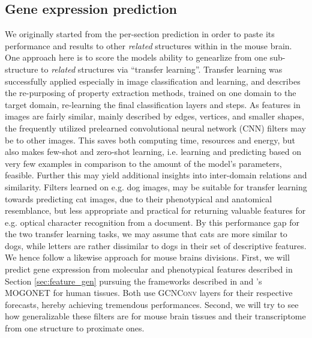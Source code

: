 \documentclass[]{article}
\begin{document}
\subsection{Gene expression prediction}
\label{sec:results_genexp}
We originally started from the per-section prediction in order to paste its performance and results to other \textit{related} structures within in the mouse brain. One approach here is to score the models ability to genearlize from one sub-structure to \textit{related} structures via ``transfer learning''. Transfer learning was successfully applied especially in image classification and learning, and describes the re-purposing of property extraction methods, trained on one domain to the target domain, re-learning the final classification layers and steps. As features in images are fairly similar, mainly described by edges, vertices, and smaller shapes, the frequently utilized prelearned convolutional neural network (CNN) filters may be to other images. This saves both computing time, resources and energy, but also makes few-shot and zero-shot learning, i.e. learning and predicting based on very few examples in comparison to the amount of the model's parameters, feasible. Further this may yield additional insights into inter-domain relations and similarity. Filters learned on e.g. dog images, may be suitable for transfer learning towards predicting cat images, due to their phenotypical and anatomical resemblance, but less appropriate and practical for returning valuable features for e.g. optical character recognition from a document. By this performance gap for the two transfer learning tasks, we may assume that cats are more similar to dogs, while letters are rather dissimilar to dogs in their set of descriptive features. \\

We hence follow a likewise approach for mouse brains divisions. First, we will predict gene expression from molecular and phenotypical features described in Section \ref{sec:feature_gen} pursuing the frameworks described in \citet{schulte2021integration} and \citet{wang2021mogonet}'s MOGONET for human tissues. Both use \textsc{GCNConv} layers for their respective forecasts, hereby achieving tremendous performances. Second, we will try to see how generalizable these filters are for mouse brain tissues and their transcriptome from one structure to proximate ones.\\
\end{document}
